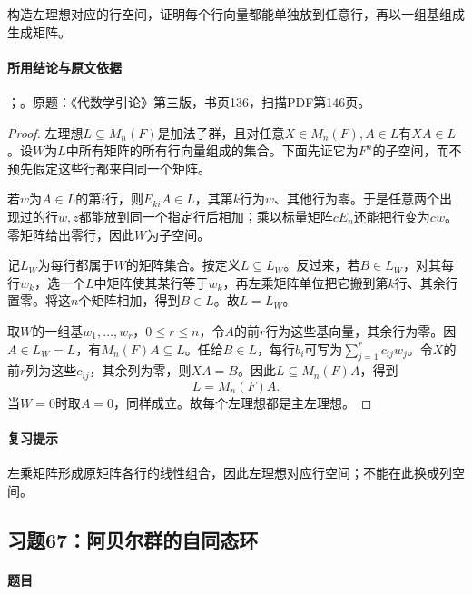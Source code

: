 构造左理想对应的行空间，证明每个行向量都能单独放到任意行，再以一组基组成生成矩阵。

\paragraph{所用结论与原文依据}

；。原题：《代数学引论》第三版，书页136，扫描PDF第146页。


\begin{proof}

左理想$L\subseteq M_n(F)$是加法子群，且对任意$X\in M_n(F),A\in L$有$XA\in L$。设$W$为$L$中所有矩阵的所有行向量组成的集合。下面先证它为$F^n$的子空间，而不预先假定这些行都来自同一个矩阵。

若$w$为$A\in L$的第$i$行，则$E_{ki}A\in L$，其第$k$行为$w$、其他行为零。于是任意两个出现过的行$w,z$都能放到同一个指定行后相加；乘以标量矩阵$cE_n$还能把行变为$cw$。零矩阵给出零行，因此$W$为子空间。

记$L_W$为每行都属于$W$的矩阵集合。按定义$L\subseteq L_W$。反过来，若$B\in L_W$，对其每行$w_k$，选一个$L$中矩阵使其某行等于$w_k$，再左乘矩阵单位把它搬到第$k$行、其余行置零。将这$n$个矩阵相加，得到$B\in L$。故$L=L_W$。

取$W$的一组基$w_1,\ldots,w_r$，$0\le r\le n$，令$A$的前$r$行为这些基向量，其余行为零。因$A\in L_W=L$，有$M_n(F)A\subseteq L$。任给$B\in L$，每行$b_i$可写为$\sum_{j=1}^r c_{ij}w_j$。令$X$的前$r$列为这些$c_{ij}$，其余列为零，则$XA=B$。因此$L\subseteq M_n(F)A$，得到
\[
L=M_n(F)A.
\]
当$W=0$时取$A=0$，同样成立。故每个左理想都是主左理想。

\end{proof}

\paragraph{复习提示}

左乘矩阵形成原矩阵各行的线性组合，因此左理想对应行空间；不能在此换成列空间。



\subsection{习题67：阿贝尔群的自同态环}

\label{ex:3:67}

\paragraph{题目}


